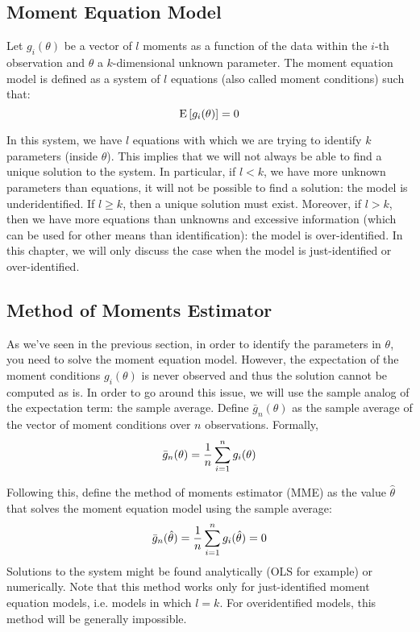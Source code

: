 \subsection{Moment Equation Model}

Let $g_i(\theta)$ be a vector of $l$ moments as a function of the data within the $i$-th observation and $\theta$ a $k$-dimensional unknown parameter. The moment equation model is defined as a system of $l$ equations (also called moment conditions) such that: $$\operatorname{E}\left[g_i(\theta)\right] = 0$$

In this system, we have $l$ equations with which we are trying to identify $k$ parameters (inside $\theta$). This implies that we will not always be able to find a unique solution to the system. In particular, if $l < k$, we have more unknown parameters than equations, it will not be possible to find a solution: the model is underidentified. If $l \geq k$, then a unique solution must exist. Moreover, if $l>k$, then we have more equations than unknowns and excessive information (which can be used for other means than identification): the model is over-identified. In this chapter, we will only discuss the case when the model is just-identified or over-identified.

\subsection{Method of Moments Estimator}

As we've seen in the previous section, in order to identify the parameters in $\theta$, you need to solve the moment equation model. However, the expectation of the moment conditions $g_i(\theta)$ is never observed and thus the solution cannot be computed as is. In order to go around this issue, we will use the sample analog of the expectation term: the sample average. Define $\bar g_n(\theta)$ as the sample average of the vector of moment conditions over $n$ observations. Formally, $$\bar g_n(\theta) = \frac{1}{n} \sum_{i=1}^{n} g_i(\theta)$$

Following this, define the method of moments estimator (MME) as the value $\hat\theta$ that solves the moment equation model using the sample average: $$ \bar g_n(\hat\theta) = \frac{1}{n} \sum_{i=1}^{n} g_i(\hat\theta) = 0 $$ Solutions to the system might be found analytically (OLS for example) or numerically. Note that this method works only for just-identified moment equation models, i.e. models in which $l=k$. For overidentified models, this method will be generally impossible.

